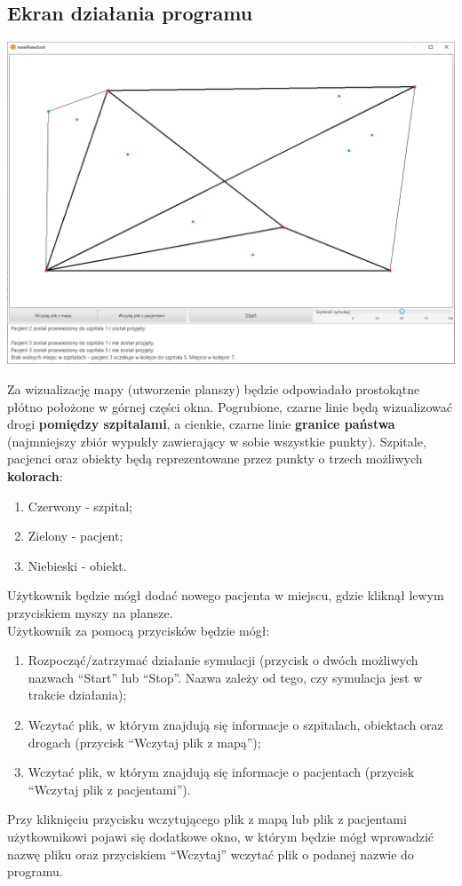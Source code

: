 \documentclass{article}
\begin{document}
    \subsection{Ekran działania programu}
    \begin{center}
        \includegraphics[scale=0.4]{gui.png}
    \end{center}
    Za wizualizację mapy (utworzenie planszy) będzie odpowiadało prostokątne płótno położone w górnej części okna. Pogrubione, czarne linie będą wizualizować drogi \textbf{pomiędzy szpitalami}, a cienkie, czarne linie \textbf{granice państwa} (najmniejszy zbiór wypukły zawierający w sobie wszystkie punkty). Szpitale, pacjenci oraz obiekty będą reprezentowane przez punkty o trzech możliwych \textbf{kolorach}:
    \begin{enumerate}
      \item Czerwony - szpital;
      \item Zielony - pacjent;
      \item Niebieski - obiekt.
    \end{enumerate}
    Użytkownik  będzie mógł dodać nowego pacjenta w miejscu, gdzie kliknął lewym przyciskiem myszy na plansze. \\
    Użytkownik za pomocą przycisków będzie mógł:
    \begin{enumerate}
      \item Rozpocząć/zatrzymać działanie symulacji (przycisk o dwóch możliwych nazwach ``Start'' lub ``Stop''. Nazwa
      zależy od tego, czy symulacja jest w trakcie działania);
      \item Wczytać plik, w którym znajdują się informacje o szpitalach, obiektach oraz drogach (przycisk ``Wczytaj plik z mapą'');
      \item Wczytać plik, w którym znajdują się informacje o pacjentach (przycisk ``Wczytaj plik z pacjentami'').
    \end{enumerate}
    Przy kliknięciu przycisku wczytującego plik z mapą lub plik z pacjentami użytkownikowi pojawi się dodatkowe okno, w którym będzie mógł wprowadzić nazwę pliku oraz przyciskiem ``Wczytaj'' wczytać plik o podanej nazwie do programu.
\end{document}
